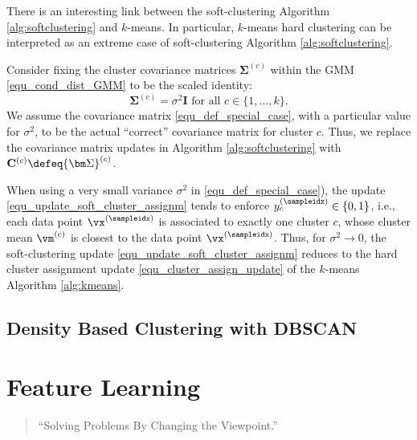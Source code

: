 \documentclass[12pt]{report}
\begin{document}
There is an interesting link between the soft-clustering 
Algorithm \ref{alg:softclustering} and $k$-means. In 
particular, $k$-means hard clustering can be interpreted 
as an extreme case of soft-clustering Algorithm \ref{alg:softclustering}. 

Consider fixing the cluster covariance matrices $ {\bm \Sigma}^{(c)}$ 
within the GMM \eqref{equ_cond_dist_GMM} to be the scaled identity: 
\begin{equation}
\label{equ_def_special_case}
 {\bm \Sigma}^{(c)}= \sigma^{2} \mathbf{I} \mbox{ for all } c \in \{1,\ldots,k\}.  
\end{equation} 
We assume the covariance matrix \eqref{equ_def_special_case}, 
with a particular value for $\sigma^{2}$, to be the actual ``correct'' 
covariance matrix for cluster $c$. %
Thus, we replace the covariance matrix updates in Algorithm \ref{alg:softclustering} 
with $\mathbf{C}^{(c)} \defeq  {\bm \Sigma}^{(c)}$.
 
When using a very small variance $\sigma^{2}$ in \eqref{equ_def_special_case}), 
the update \eqref{equ_update_soft_cluster_assignm} tends to enforce 
$y_{c}^{(\sampleidx)} \in \{0,1\}$, i.e., each data point $\vx^{(\sampleidx)}$ 
is associated to exactly one cluster $c$, whose cluster mean $\vm^{(c)}$ 
is closest to the data point $\vx^{(\sampleidx)}$. Thus, for $\sigma^{2} \rightarrow 0$, 
the soft-clustering update \eqref{equ_update_soft_cluster_assignm} reduces 
to the hard cluster assignment update \eqref{equ_cluster_assign_update} 
of the $k$-means Algorithm \ref{alg:kmeans}. 

\section{Density Based Clustering with DBSCAN}

\newpage
\chapter{Feature Learning} 
\label{ch_FeatureLearning}

\begin{quote}
``Solving Problems By Changing the Viewpoint.''
\end{quote}
\end{document}
